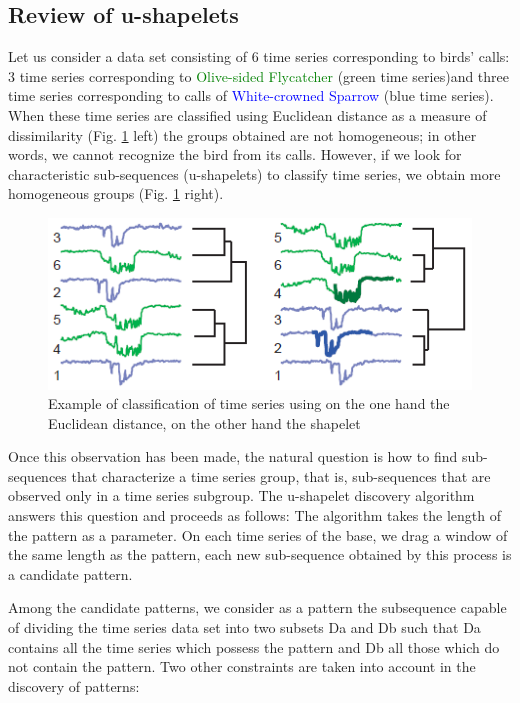 \subsection{Review of u-shapelets}


Let us consider a data set consisting of 6 time series corresponding to birds' calls: 3 time series corresponding to \textcolor{green}{Olive-sided Flycatcher} (green time series)and three time series corresponding to calls of \textcolor{blue}{White-crowned Sparrow} (blue time series). When these time series are classified using Euclidean distance as a measure of dissimilarity (Fig. \ref{US} left) the groups obtained are not homogeneous; in other words, we cannot recognize the bird from its calls. However, if we look for characteristic sub-sequences (u-shapelets) to classify time series, we obtain more homogeneous groups (Fig. \ref{US} right).
  
 \begin{figure}[h]
  \centering
  \includegraphics[scale=0.60]{images/exemple_shapelet}
    \caption{Example of classification of time series using on the one hand the Euclidean distance, on the other hand the shapelet \cite{ulanova2015scalable}}
  \label{US}
 \end{figure}
 

Once this observation has been made, the natural question is how to find sub-sequences that characterize a time series group, that is, sub-sequences that are observed only in a time series subgroup. The u-shapelet discovery algorithm answers this question and proceeds as follows: 
The algorithm takes the length of the pattern as a parameter.
On each time series of the base, we drag a window of the same length as the pattern, each new sub-sequence obtained by this process is a candidate pattern.


Among the candidate patterns, we consider as a pattern the subsequence capable of dividing the time series data set into two subsets Da and Db such that Da contains all the time series which possess the pattern and Db all those which do not contain the pattern. Two other constraints are taken into account in the discovery of patterns: 



